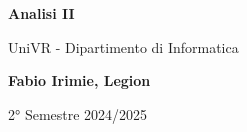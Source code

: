 \begin{titlepage}
	\begin{center}
		\vspace*{1cm}

		\Huge
		\textbf{Analisi II}

		\vspace{0.5cm}
		\LARGE
		UniVR - Dipartimento di Informatica

		\vspace{1.5cm}

		\textbf{Fabio Irimie, Legion}

		\vfill


		\vspace{0.8cm}


		2° Semestre 2024/2025

	\end{center}
\end{titlepage}
